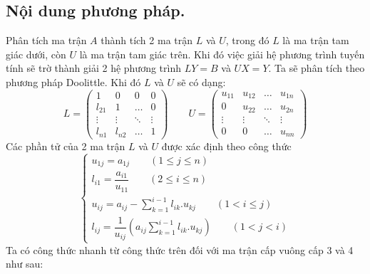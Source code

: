 \documentclass[12pt, a4paper]{report}
\begin{document}
\subsection{Nội dung phương pháp.}
Phân tích ma trận $A$ thành tích 2 ma trận $L$ và $U$, trong đó $L$ là ma trận tam giác dưới, còn $U$ là ma trận tam giác trên. Khi đó việc giải hệ phương trình tuyến tính sẽ trờ thành giải 2 hệ phương trình $LY=B$ và $UX = Y$. Ta sẽ phân tích theo phương pháp Doolittle. Khi đó $L$ và $U$ sẽ có dạng:
\[
    L = \begin{pmatrix}
        1 & 0 & 0  & 0 \\
        l_{21} & 1 & \dots  & 0 \\
        \vdots & \vdots & \ddots & \vdots \\
        l_{n1} & l_{n2} & \dots  & 1
    \end{pmatrix} \qquad U = \begin{pmatrix}
        u_{11} & u_{12} &  \dots  & u_{1n} \\
        0 & u_{22} &  \dots  & u_{2n} \\
        \vdots & \vdots & \ddots & \vdots\\
        0 & 0 &  \dots  & u_{nn}
    \end{pmatrix}
\]
Các phần tử của 2 ma trận $L$ và $U$ được xác định theo công thức
\[
    \begin{cases}
        u_{1j} = a_{1j} \qquad (1 \leq j \leq n) \\
        l_{i1} = \dfrac{a_{i1}}{u_{11}} \qquad (2 \leq i \leq n) \\
        u_{ij} = a_{ij} - \displaystyle \sum_{k=1}^{i-1} l_{ik}.u_{kj} \qquad (1 < i \leq j) \\
        l_{ij} = \dfrac{1}{u_{ij}} \left( \displaystyle a_{ij} \sum_{k=1}^{i-1} l_{ik}.u_{kj} \right) \qquad (1<j<i)
    \end{cases}    
\]
Ta có công thức nhanh từ công thức trên đối với ma trận cấp vuông cấp 3 và 4 như sau:
\end{document}
